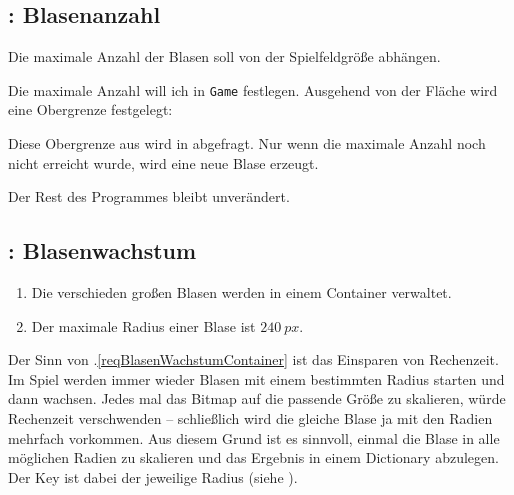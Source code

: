 

\subsection{: Blasenanzahl}
	Die maximale Anzahl der Blasen soll von der Spielfeldgröße abhängen.
\er

Die maximale Anzahl will ich in \texttt{Game} festlegen. Ausgehend von der Fläche wird eine Obergrenze festgelegt:


Diese Obergrenze aus  wird in  abgefragt. Nur wenn die maximale Anzahl noch nicht erreicht wurde, wird eine neue Blase erzeugt.


Der Rest des Programmes bleibt unverändert.

\subsection{: Blasenwachstum}
	\begin{enumerate}
		\item Die verschieden großen Blasen werden in einem Container verwaltet.\label{reqBlasenWachstumContainer}
		
		\item Der maximale Radius einer Blase ist $240~px$.\label{reqBlasenWachstumMax}
	\end{enumerate}
\er

Der Sinn von .\ref{reqBlasenWachstumContainer} ist das Einsparen von Rechenzeit. Im Spiel werden immer wieder Blasen mit einem bestimmten Radius starten und dann wachsen. Jedes mal das Bitmap auf die passende Größe zu skalieren, würde Rechenzeit verschwenden -- schließlich wird die gleiche Blase ja mit den Radien mehrfach vorkommen. Aus diesem Grund ist es sinnvoll, einmal die Blase in alle möglichen Radien zu skalieren und das Ergebnis in einem Dictionary abzulegen. Der Key ist dabei der jeweilige Radius (siehe ).

